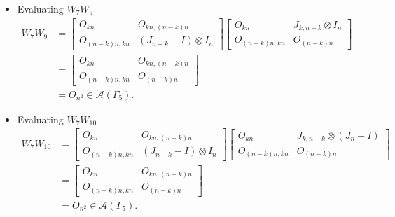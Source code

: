 \begin{itemize}
\item Evaluating $W_{7}W_{9}$
\begin{align*}
    W_7W_9
    &= \begin{bmatrix}
        O_{kn} & O_{kn, (n-k)n} \\
        O_{(n-k)n,kn} & (J_{n - k} - I) \otimes I_n
    \end{bmatrix}
    \begin{bmatrix}
        O_{kn} & J_{k,n-k} \otimes I_n \\
        O_{(n-k)n,kn} & O_{(n-k)n}
    \end{bmatrix}\\
    &= \begin{bmatrix}
        O_{kn} & O_{kn, (n-k)n} \\
        O_{(n-k)n,kn} & O_{(n - k)n}
    \end{bmatrix}\\
    &= O_{n^2} \in\mathcal{A}(\Gamma_5).
\end{align*}

\item Evaluating $W_{7}W_{10}$
\begin{align*}
    W_7W_{10}
    &= \begin{bmatrix}
        O_{kn} & O_{kn, (n-k)n} \\
        O_{(n-k)n,kn} & (J_{n - k} - I) \otimes I_n
    \end{bmatrix}
    \begin{bmatrix}
        O_{kn} & J_{k,n-k} \otimes (J_n-I) \\
        O_{(n-k)n,kn} & O_{(n-k)n}
    \end{bmatrix}\\
    &= \begin{bmatrix}
        O_{kn} & O_{kn, (n-k)n} \\
        O_{(n-k)n,kn} & O_{(n - k)n}
    \end{bmatrix}\\
    &= O_{n^2} \in\mathcal{A}(\Gamma_5).
\end{align*}


\end{itemize}
